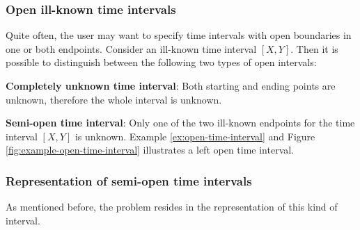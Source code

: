 \subsubsection{\label{subsubsec:open-interval}Open ill-known time intervals}
Quite often, the user may want to specify time intervals with open boundaries in one or both endpoints. Consider an ill-known time interval $\left[X, Y\right]$. Then it is possible to distinguish between the following two types of open intervals:
\begin{definition}
\textbf{Completely unknown time interval}: Both starting and ending points are unknown, therefore the whole interval is unknown.
\end{definition}

\begin{definition}
\textbf{Semi-open time interval}: Only one of the two ill-known endpoints for the time interval $\left[X, Y\right]$ is unknown. Example \ref{ex:open-time-interval} and Figure \ref{fig:example-open-time-interval} illustrates a left open time interval.
\end{definition}

\subsubsection{\label{subsubsec:representation-semi-open}Representation of semi-open time intervals}
As mentioned before, the problem resides in the representation of this kind of interval. 


